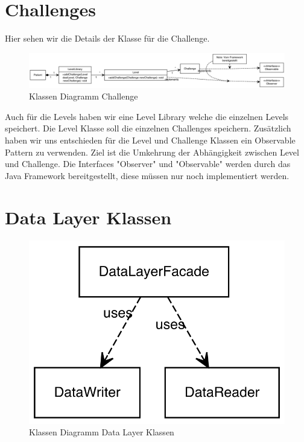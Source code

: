 \section{Challenges}
Hier sehen wir die Details der Klasse für die Challenge.
\begin{figure}[H]
\centering
\includegraphics[width=1\textwidth]{../ClassDiagramms/Challange.png}
\caption{Klassen Diagramm Challenge}
\end{figure}
Auch für die Levels haben wir eine Level Library welche die einzelnen Levels speichert. Die Level Klasse soll die einzelnen Challenges speichern. Zusätzlich haben wir uns entschieden für die Level und Challenge Klassen ein Observable Pattern zu verwenden. Ziel ist die Umkehrung der Abhängigkeit zwischen Level und Challenge. Die Interfaces "Observer" und "Observable" werden durch das Java Framework bereitgestellt, diese müssen nur noch implementiert werden.

\section{Data Layer Klassen}
\begin{figure}[H]
\centering
\includegraphics[width=1\textwidth]{../ClassDiagramms/DataLayer.png}
\caption{Klassen Diagramm Data Layer Klassen}
\end{figure}

